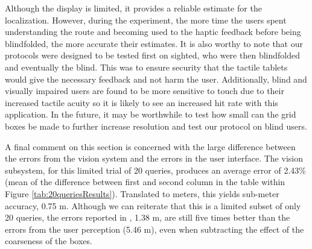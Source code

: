 Although the display is limited, it provides a reliable estimate for the localization.  However, during the experiment, the more time the users spent understanding the route and becoming used to the haptic feedback before being blindfolded, the more accurate their estimates. It is also worthy to note that our protocols were designed to be tested first on sighted, who were then blindfolded and eventually the blind.  This was to ensure security that the tactile tablets would give the necessary feedback and not harm the user. Additionally, blind and visually impaired users are found to be more sensitive to touch due to their increased tactile acuity \citep{goldreich2003tactile} so it is likely to see an increased hit rate with this application. 
In the future, it may be worthwhile to test how small can the grid boxes be made to further increase resolution and test our protocol on blind users.  

A final comment on this section is concerned with the large difference between the errors from the vision system and the errors in the user interface. The vision subsystem, for this limited trial of 20 queries, produces an average error of 2.43\% (mean of the difference between first and second column in the table within Figure \ref{tab:20queriesResults}). Translated to meters, this yields sub-meter accuracy, 0.75 m. Although we can reiterate that this is a limited subset of only 20 queries, the errors reported in \citep{RiveraWearable}, 1.38 m, are still five times better than the errors from the user perception (5.46 m), even when subtracting the effect of the coarseness of the boxes.

